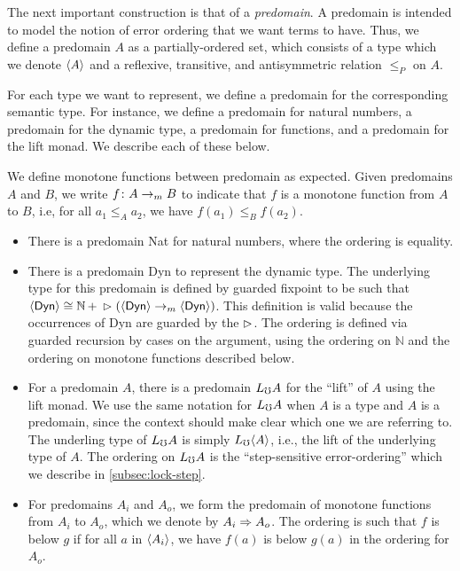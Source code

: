 The next important construction is that of a \emph{predomain}. A predomain is intended to
model the notion of error ordering that we want terms to have. Thus, we define a predomain $A$
as a partially-ordered set, which consists of a type which we denote $\langle {A} \rangle$ and a reflexive,
transitive, and antisymmetric relation $\le_P$ on $A$.

For each type we want to represent, we define a predomain for the corresponding semantic
type. For instance, we define a predomain for natural numbers, a predomain for the
dynamic type, a predomain for functions, and a predomain for the lift monad. We
describe each of these below.

We define monotone functions between predomain as expected. Given predomains
$A$ and $B$, we write $f \colon A \to_m B$ to indicate that $f$ is a monotone
function from $A$ to $B$, i.e, for all $a_1 \le_A a_2$, we have $f(a_1) \le_B f(a_2)$.

\begin{itemize}
  \item There is a predomain Nat for natural numbers, where the ordering is equality.
  
  \item There is a predomain Dyn to represent the dynamic type. The underlying type
  for this predomain is defined by guarded fixpoint to be such that
  $\langle {\mathsf{Dyn}} \rangle \cong \mathbb{N}\, +\, \vartriangleright (\langle {\mathsf{Dyn}} \rangle \to_m \langle {\mathsf{Dyn}} \rangle)$.
  This definition is valid because the occurrences of Dyn are guarded by the $\vartriangleright$.
  The ordering is defined via guarded recursion by cases on the argument, using the
  ordering on $\mathbb{N}$ and the ordering on monotone functions described below.

  \item For a predomain $A$, there is a predomain $L_\mho A$ for the ``lift'' of $A$
  using the lift monad. We use the same notation for $L_\mho A$ when $A$ is a type
  and $A$ is a predomain, since the context should make clear which one we are referring to.
  The underling type of $L_\mho A$ is simply $L_\mho \langle {A} \rangle$, i.e., the lift of the underlying
  type of $A$.
  The ordering on $L_\mho A$ is the ``step-sensitive error-ordering'' which we describe in
  \ref{subsec:lock-step}.

  \item For predomains $A_i$ and $A_o$, we form the predomain of monotone functions
  from $A_i$ to $A_o$, which we denote by $A_i \Rightarrow A_o$.
  The ordering is such that $f$ is below $g$ if for all $a$ in $\langle {A_i} \rangle$, we have
  $f(a)$ is below $g(a)$ in the ordering for $A_o$. 
\end{itemize}



